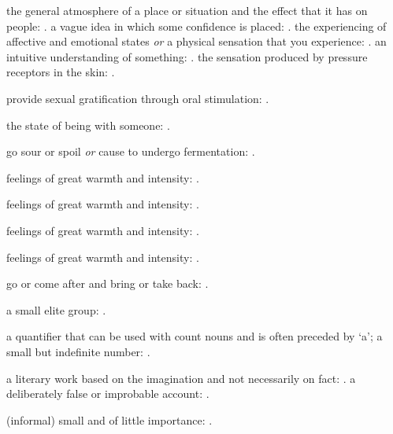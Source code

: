   the general atmosphere of a place or situation and the effect that it has on people: . a vague idea in which some confidence is placed: . the experiencing of affective and emotional states \textit{or} a physical sensation that you experience: . an intuitive understanding of something: . the sensation produced by pressure receptors in the skin: .

  provide sexual gratification through oral stimulation: .

  the state of being with someone: .

  go sour or spoil \textit{or} cause to undergo fermentation: .

  feelings of great warmth and intensity: .

  feelings of great warmth and intensity: .

  feelings of great warmth and intensity: .

  feelings of great warmth and intensity: .

  go or come after and bring or take back: .

  a small elite group: .

  a quantifier that can be used with count nouns and is often preceded by `a'; a small but indefinite number: .

  a literary work based on the imagination and not necessarily on fact: . a deliberately false or improbable account: .

  (informal) small and of little importance: .

